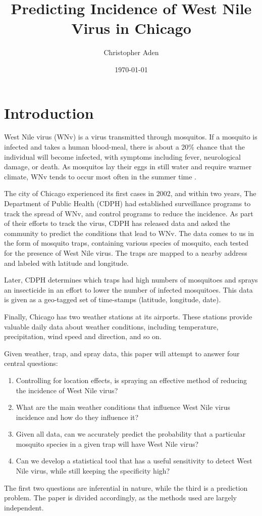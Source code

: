 \documentclass[12pt]{article}
\title{Predicting Incidence of West Nile Virus in Chicago}
\author{Christopher Aden}
\date{\today}
\begin{document}
\maketitle

\section{Introduction}
West Nile virus (WNv) is a virus transmitted through mosquitos. If a mosquito is infected and takes a human blood-meal, there is about a 20\% chance that the individual will become infected, with symptoms including fever, neurological damage, or death. As mosquitos lay their eggs in still water and require warmer climate, WNv tends to occur most often in the summer time \cite{ruiz2009local}.

The city of Chicago experienced its first cases in 2002, and within two years, The Department of Public Health (CDPH) had established surveillance programs to track the spread of WNv, and control programs to reduce the incidence. As part of their efforts to track the virus, CDPH has released data and asked the community to predict the conditions that lead to WNv. The data comes to us in the form of mosquito traps, containing various species of mosquito, each tested for the presence of West Nile virus. The traps are mapped to a nearby address and labeled with latitude and longitude. 

Later, CDPH determines which traps had high numbers of mosquitoes and sprays an insecticide in an effort to lower the number of infected mosquitoes. This data is given as a geo-tagged set of time-stamps (latitude, longitude, date). 

Finally, Chicago has two weather stations at its airports. These stations provide valuable daily data about weather conditions, including temperature, precipitation, wind speed and direction, and so on.

Given weather, trap, and spray data, this paper will attempt to answer four central questions:
\begin{enumerate}
\item Controlling for location effects, is spraying an effective method of reducing the incidence of West Nile virus?
\item What are the main weather conditions that influence West Nile virus incidence and how do they influence it?
\item Given all data, can we accurately predict the probability that a particular mosquito species in a given trap will have West Nile virus?
\item Can we develop a statistical tool that has a useful sensitivity to detect West Nile virus, while still keeping the specificity high?
\end{enumerate}
The first two questions are inferential in nature, while the third is a prediction problem. The paper is divided accordingly, as the methods used are largely independent.
\end{document}
